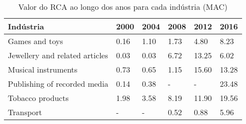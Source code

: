 \begin{table}
\centering
\caption{Valor do RCA ao longo dos anos para cada indústria (MAC)}
\begin{tabular}{p{6cm}p{1.5cm}p{1.5cm}p{1.5cm}p{1.5cm}p{1.5cm}}
\toprule
                     Indústria & 2000 & 2004 & 2008 &  2012 &  2016 \\
\midrule
                Games and toys & 0.16 & 1.10 & 1.73 &  4.80 &  8.23 \\
Jewellery and related articles & 0.03 & 0.03 & 6.72 & 13.25 &  6.02 \\
           Musical instruments & 0.73 & 0.65 & 1.15 & 15.60 & 13.28 \\
  Publishing of recorded media & 0.14 & 0.38 &    - &     - & 23.48 \\
              Tobacco products & 1.98 & 3.58 & 8.19 & 11.90 & 19.56 \\
                     Transport &    - &    - & 0.52 &  0.88 &  5.96 \\
\bottomrule
\end{tabular}
\end{table}

